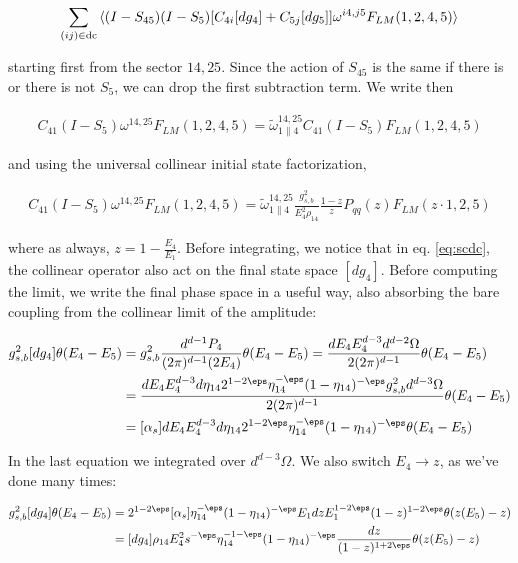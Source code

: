 \documentclass[11pt]{report}
\begin{document}
\begin{align}
    \label{eq:scdc}
    \sum_{(ij) \in \text{dc}}\braket{(I - S_{45})(I-S_5)[C_{4i}[dg_4] + C_{5j}[dg_5]]\omega^{i4, j5}F_{LM}(1, 2, 4, 5)}
\end{align}

starting first from the sector \(14, 25\). Since the action of \(S_{45}\) is the same if there is or there is not \(S_5\), we can drop the first subtraction term. We write then 

\begin{align}
    C_{41}(I-S_5)\omega^{14, 25}F_{LM}(1, 2, 4, 5) = \tilde{\omega}^{14, 25}_{1 \parallel 4}C_{41}(I-S_5)F_{LM}(1, 2, 4, 5)
\end{align}

and using the universal collinear initial state factorization, 

\begin{align}
    C_{41}(I-S_5)\omega^{14, 25}F_{LM}(1, 2, 4, 5) = \tilde{\omega}^{14, 25}_{1 \parallel 4}\frac{g_{s, b}^2}{E_4^2\rho_{14}}\frac{1-z}{z}P_{qq}(z)F_{LM}(z\cdot 1, 2, 5)
\end{align}

where as always, \(z = 1-\frac{E_4}{E_1}\). Before integrating, we notice that in eq. \ref{eq:scdc}, the collinear operator also act on the final state space \([dg_4]\). Before computing the limit, we write the final phase space in a useful way, also absorbing the bare coupling from the collinear limit of the amplitude: 

\begin{align}
    g^2_{s, b} [dg_4]\theta(E_4-E_5) &= g_{s, b}^2 \frac{d^{d-1}P_4}{(2\pi)^{d-1}(2E_4)}\theta(E_4-E_5) = \frac{dE_4 E_4^{d-3}d^{d-2}\Omega}{2 (2\pi)^{d-1}}\theta(E_4-E_5) \notag \\ 
    &= \frac{dE_4 E_4^{d-3} d\eta_{14} 2^{1-2\eps}\eta_{14}^{-\eps}(1-\eta_{14})^{-\eps}g_{s, b}^2 d^{d-3}\Omega}{2(2\pi)^{d-1}}\theta(E_4-E_5) \notag \\ 
    &= [\alpha_s]dE_4 E_4^{d-3} d\eta_{14} 2^{1-2\eps}\eta_{14}^{-\eps}(1-\eta_{14})^{-\eps}\theta(E_4-E_5)
\end{align}

In the last equation we integrated over \(d^{d-3}\Omega\). We also switch \(E_4 \to z\), as we've done many times: 

\begin{align}
    g^2_{s, b} [dg_4]\theta(E_4-E_5) &= 2^{1-2\eps}[\alpha_s]\eta_{14}^{-\eps}(1-\eta_{14})^{-\eps}E_1 dz E_1^{1-2\eps}(1-z)^{1-2\eps}\theta(z(E_5) - z) \notag \\ 
    &= [dg_4]\rho_{14}E_4^2 s^{-\eps} \eta_{14}^{-1-\eps}(1-\eta_{14})^{-\eps} \frac{dz}{(1-z)^{1+2\eps}} \theta(z(E_5) -z)
\end{align}
\end{document}
